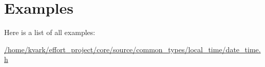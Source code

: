 \section{Examples}
Here is a list of all examples\+:\begin{DoxyCompactItemize}
\item 
\hyperlink{_2home_2kvark_2effort_project_2core_2source_2common_types_2local_time_2date_time_8h-example}{/home/kvark/effort\+\_\+project/core/source/common\+\_\+types/local\+\_\+time/date\+\_\+time.\+h}
\end{DoxyCompactItemize}
